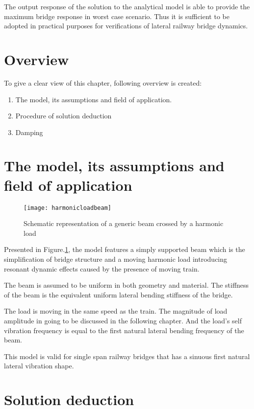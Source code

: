 The output response of the solution to the analytical model is able to provide the maximum bridge response in worst case scenario. Thus it is sufficient to be adopted in practical purposes for verifications of lateral railway bridge dynamics.


\section{Overview}

To give a clear view of this chapter, following overview is created:

\begin{enumerate}
    \item The model, its assumptions and field of application. 
    \item Procedure of solution deduction
    \item Damping
\end{enumerate}

\section{The model, its assumptions and field of application}

\begin{figure}[h]
    \centering
    \texttt{[image: harmonicloadbeam]}
    \caption{Schematic representation of a generic beam crossed by a harmonic load}
    \label{fig:harmonicloadbeam}
\end{figure}

Presented in Figure.\ref{fig:harmonicloadbeam}, the model features a simply supported beam which is the simplification of bridge structure and a moving harmonic load introducing resonant dynamic effects caused by the presence of moving train.

The beam is assumed to be uniform in both geometry and material. The stiffness of the beam is the equivalent uniform lateral bending stiffness of the bridge. 

The load is moving in the same speed as the train. The magnitude of load amplitude in going to be discussed in the following chapter. And the load's self vibration frequency is equal to the first natural lateral bending frequency of the beam.


This model is valid for single span railway bridges that has a sinuous first natural lateral vibration shape.  

\section{Solution deduction}

